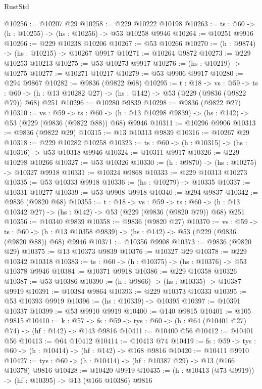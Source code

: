 \begin{lexlean}{RustStd}
\begin{coremodule}
@10256 := @10207 @29
@10258 := @229 @10222 @10198
@10263 := {ts : @60} -> (h : @10255) -> (hs : @10256) -> @53 @10258 @9946
@10264 := @10251 @9916
@10266 := @229 @10238 @10206
@10267 := @53 @10266
@10270 := (h : @9874) -> (hs : @10215) -> @10267 @9917
@10271 := @10264 @9872
@10273 := @229 @10253 @10213
@10275 := @53 @10273 @9917
@10276 := (hs : @10219) -> @10275
@10277 := @10271 @10217
@10279 := @53 @9906 @9917
@10280 := @294 @9867
@10282 := @9836 (@9822 @68)
@10295 := {t : @18} ->
  {vs : @59} ->
  {ts : @60} -> (h : @13 @10282 @27) -> (hs : @142) -> @53 (@229 (@9836 (@9822 @79)) @68) @251
@10296 := @10280 @9839
@10298 := @9836 (@9822 @27)
@10310 := {vs : @59} ->
  {ts : @60} -> (h : @13 @10298 @9839) -> (hs : @142) -> @53 (@229 (@9836 (@9822 @88)) @68) @9946
@10311 := @10296 @9906
@10313 := @9836 (@9822 @29)
@10315 := @13 @10313 @9839
@10316 := @10267 @29
@10318 := @229 @10282 @10258
@10323 := {ts : @60} -> (h : @10315) -> (hs : @10316) -> @53 @10318 @9946
@10324 := @10311 @9917
@10326 := @229 @10298 @10266
@10327 := @53 @10326
@10330 := (h : @9870) -> (hs : @10275) -> @10327 @9918
@10331 := @10324 @9868
@10333 := @229 @10313 @10273
@10335 := @53 @10333 @9918
@10336 := (hs : @10279) -> @10335
@10337 := @10331 @10277
@10339 := @53 @9908 @9918
@10340 := @294 @9837
@10342 := @9836 (@9820 @68)
@10355 := {t : @18} ->
  {vs : @59} ->
  {ts : @60} -> (h : @13 @10342 @27) -> (hs : @142) -> @53 (@229 (@9836 (@9820 @79)) @68) @251
@10356 := @10340 @9839
@10358 := @9836 (@9820 @27)
@10370 := {vs : @59} ->
  {ts : @60} -> (h : @13 @10358 @9839) -> (hs : @142) -> @53 (@229 (@9836 (@9820 @88)) @68) @9946
@10371 := @10356 @9908
@10373 := @9836 (@9820 @29)
@10375 := @13 @10373 @9839
@10376 := @10327 @29
@10378 := @229 @10342 @10318
@10383 := {ts : @60} -> (h : @10375) -> (hs : @10376) -> @53 @10378 @9946
@10384 := @10371 @9918
@10386 := @229 @10358 @10326
@10387 := @53 @10386
@10390 := (h : @9866) -> (hs : @10335) -> @10387 @9919
@10391 := @10384 @9864
@10393 := @229 @10373 @10333
@10395 := @53 @10393 @9919
@10396 := (hs : @10339) -> @10395
@10397 := @10391 @10337
@10399 := @53 @9910 @9919
@10400 := @140 @9815
@10401 := @105 @9815
@10410 := {k : @57} ->
  {fs : @59} -> {tys : @60} -> (h : @64 (@10401 @27) @74) -> (hf : @142) -> @143 @9816
@10411 := @10400 @56
@10412 := @10401 @56
@10413 := @64 @10412
@10414 := @10413 @74
@10419 := {fs : @59} -> {tys : @60} -> (h : @10414) -> (hf : @142) -> @168 @9816
@10420 := @10411 @9910
@10427 := {tys : @60} -> (h : @10414) -> (hf : @10387 @29) -> @13 (@166 @10378) @9816
@10428 := @10420 @9919
@10435 := (h : @10413 (@73 @9919)) -> (hf : @10395) -> @13 (@166 @10386) @9816

\end{coremodule}
\end{lexlean}
